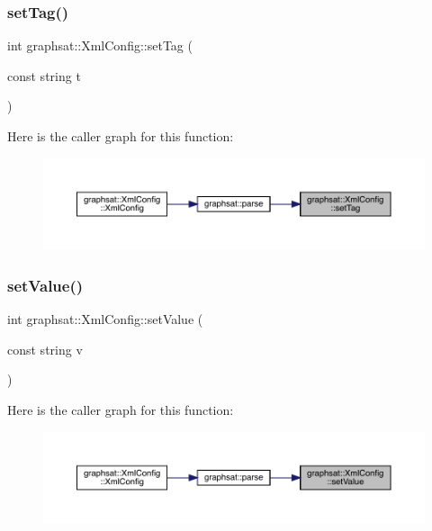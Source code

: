 \subsubsection{\texorpdfstring{setTag()}{setTag()}}
{\footnotesize\ttfamily int graphsat\+::\+Xml\+Config\+::set\+Tag (\begin{DoxyParamCaption}\item[{const string}]{t }\end{DoxyParamCaption})}

Here is the caller graph for this function\+:
\nopagebreak
\begin{figure}[H]
\begin{center}
\leavevmode
\includegraphics[width=350pt]{classgraphsat_1_1_xml_config_af2247871edf1a0b47fd32574e0c0396f_icgraph}
\end{center}
\end{figure}
\mbox{\label{classgraphsat_1_1_xml_config_a31da54b1b966dd9085ecfa645927b48a}} 
\subsubsection{\texorpdfstring{setValue()}{setValue()}}
{\footnotesize\ttfamily int graphsat\+::\+Xml\+Config\+::set\+Value (\begin{DoxyParamCaption}\item[{const string}]{v }\end{DoxyParamCaption})}

Here is the caller graph for this function\+:
\nopagebreak
\begin{figure}[H]
\begin{center}
\leavevmode
\includegraphics[width=350pt]{classgraphsat_1_1_xml_config_a31da54b1b966dd9085ecfa645927b48a_icgraph}
\end{center}
\end{figure}


